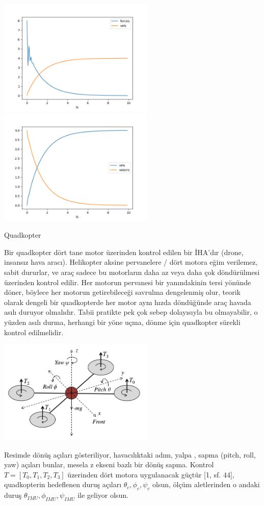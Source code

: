 \documentclass[12pt,fleqn]{article}\usepackage{../../common}
\begin{document}
\includegraphics[width=20em]{phy_030_pid_03.png}
\includegraphics[width=20em]{phy_030_pid_04.png}

Quadkopter

Bir quadkopter dört tane motor üzerinden kontrol edilen bir İHA'dır (drone,
insansız hava aracı). Helikopter aksine pervanelere / dört motora eğim
verilemez, sabit dururlar, ve araç sadece bu motorların daha az veya daha
çok döndürülmesi üzerinden kontrol edilir. Her motorun pervanesi bir
yanındakinin tersi yönünde döner, böylece her motorun getirebileceği
savrulma dengelenmiş olur, teorik olarak dengeli bir quadkopterde her motor
aynı hızda döndüğünde araç havada asılı duruyor olmalıdır. Tabii pratikte
pek çok sebep dolayısıyla bu olmayabilir, o yüzden asılı durma, herhangi
bir yöne uçma, dönme için quadkopter sürekli kontrol edilmelidir.

\includegraphics[width=20em]{phy_030_pid_01.png}

Resimde dönüş açıları gösteriliyor, havacılıktaki adım, yalpa , sapma
(pitch, roll, yaw) açıları bunlar, mesela z ekseni bazlı bir dönüş
sapma. Kontrol $T = [T_0,T_1,T_2,T_3]$ üzerinden dört motora uygulanacak
güçtür [1, sf. 44], quadkopterin hedeflenen duruş açıları
$\theta_c, \phi_c, \psi_c$ olsun, ölçüm aletlerinden o andaki duruş
$\theta_{IMU}, \phi_{IMU}, \psi_{IMU}$ ile geliyor olsun.
\end{document}
